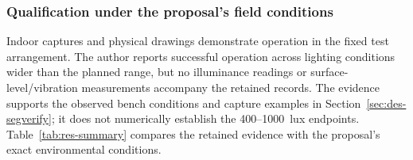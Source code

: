 \subsubsection{Qualification under the proposal's field conditions}
\label{sec:res-conditions}
Indoor captures and physical drawings demonstrate operation in the fixed test arrangement. The author reports successful operation across lighting conditions wider than the planned range, but no illuminance readings or surface-level/vibration measurements accompany the retained records. The evidence supports the observed bench conditions and capture examples in Section~\ref{sec:des-segverify}; it does not numerically establish the 400--1000~lux endpoints. Table~\ref{tab:res-summary} compares the retained evidence with the proposal's exact environmental conditions.
\FloatBarrier
